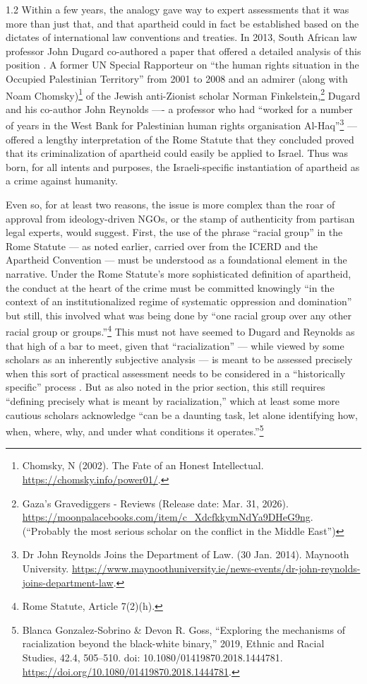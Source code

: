 \documentclass[../unravbook.tex]{subfiles}
\begin{document}
\begin{spacing}{1.2}
Within a few years, the analogy gave way to expert assessments that it was more than just that, and that apartheid could in fact be established based on the dictates of international law conventions and treaties. In 2013, South African law professor John Dugard co-authored a paper that offered a detailed analysis of this position \parencite{Dugard-2013}. A former UN Special Rapporteur on ``the human rights situation in the Occupied Palestinian Territory'' from 2001 to 2008 and an admirer (along with Noam Chomsky)\footnote{Chomsky, N (2002). The Fate of an Honest Intellectual. \url{https://chomsky.info/power01/}.} of the Jewish anti-Zionist scholar Norman Finkelstein,\footnote{Gaza's Gravediggers - Reviews (Release date: Mar. 31, 2026). \url{https://moonpalacebooks.com/item/c_XdcfkkymNdYa9DHeG9ng}. (``Probably the most serious scholar on the conflict in the Middle East'')} Dugard and his co-author John Reynolds ---- a professor who had ``worked for a number of years in the West Bank for Palestinian human rights organisation Al-Haq''\footnote{Dr John Reynolds Joins the Department of Law. (30 Jan. 2014). Maynooth University.  \url{https://www.maynoothuniversity.ie/news-events/dr-john-reynolds-joins-department-law}.} --- offered a lengthy interpretation of the Rome Statute that they concluded proved that its criminalization of apartheid could easily be applied to Israel. Thus was born, for all intents and purposes, the Israeli-specific instantiation of apartheid as a crime against humanity.

Even so, for at least two reasons, the issue is more complex than the roar of approval from ideology-driven NGOs, or the stamp of authenticity from partisan legal experts, would suggest. First, the use of the phrase ``racial group'' in the Rome Statute  --- as noted earlier, carried over from the ICERD and the Apartheid Convention  --- must be understood as a foundational element in the narrative. Under the Rome Statute's more sophisticated definition of apartheid, the conduct at the heart of the crime must be committed knowingly \enquote{in the context of an institutionalized regime of systematic oppression and domination} but still, this involved what was being done by \enquote{one racial group over any other racial group or groups.}\footnote{Rome Statute, Article 7(2)(h).} This must not have seemed to Dugard and Reynolds as that high of a bar to meet, given that ``racialization'' --- while viewed by some scholars as an inherently subjective analysis --- is meant to be assessed precisely when this sort of practical assessment needs to be considered in a \enquote{historically specific} process \parencite[64]{Omi-Winant-1994}. But as also noted in the prior section, this still requires ``defining precisely what is meant by racialization,'' which at least some more cautious scholars acknowledge \enquote{can be a daunting task, let alone identifying how, when, where, why, and under what conditions it operates.}\footnote{Blanca Gonzalez-Sobrino \&  Devon R. Goss, \enquote{Exploring the mechanisms of racialization beyond the black-white binary,} 2019, Ethnic and Racial Studies, 42.4, 505--510. doi: 10.1080/01419870.2018.1444781. \url{https://doi.org/10.1080/01419870.2018.1444781}.} 


\end{spacing}
\end{document}
